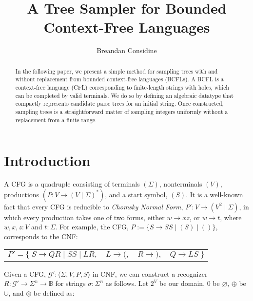 \documentclass[sigplan,nonacm,anonymous]{acmart}\settopmatter{printfolios=false,printccs=false,printacmref=false}
\begin{document}
  \title{A Tree Sampler for Bounded Context-Free Languages}
  \begin{abstract}
    In the following paper, we present a simple method for sampling trees with and without replacement from bounded context-free languages (BCFLs). A BCFL is a context-free language (CFL) corresponding to finite-length strings with holes, which can be completed by valid terminals. We do so by defining an algebraic datatype that compactly represents candidate parse trees for an initial string. Once constructed, sampling trees is a straightforward matter of sampling integers uniformly without a replacement from a finite range.
  \end{abstract}

  \author{Breandan Considine}

  \maketitle

  \section{Introduction}

  A CFG is a quadruple consisting of terminals $(\Sigma)$, nonterminals $(V)$, productions $(P\colon V \rightarrow (V \mid \Sigma)^*)$, and a start symbol, $(S)$. It is a well-known fact that every CFG is reducible to \textit{Chomsky Normal Form}, $P'\colon V \rightarrow (V^2 \mid \Sigma)$, in which every production takes one of two forms, either $w \rightarrow xz$, or $w \rightarrow t$, where $w, x, z: V$ and $t: \Sigma$. For example, the CFG, $P:=\{S \rightarrow S S \mid ( S ) \mid ()\}$, corresponds to the CNF:\vspace{-3pt}

  \begin{table}[H]
    \begin{tabular}{llll}
      $P'=\big\{\;S\rightarrow QR \mid SS \mid LR,$ & $L \rightarrow (,$ & $R \rightarrow ),$ & $Q\rightarrow LS\;\big\}$
    \end{tabular}
  \end{table}\vspace{-8pt}

  \noindent Given a CFG, $\mathcal{G}' : \langle \Sigma, V, P, S\rangle$ in CNF, we can construct a recognizer $R: \mathcal{G}' \rightarrow \Sigma^n \rightarrow \mathbb{B}$ for strings $\sigma: \Sigma^n$ as follows. Let $2^V$ be our domain, $0$ be $\varnothing$, $\oplus$ be $\cup$, and $\otimes$ be defined as:\vspace{-10pt}
\end{document}

